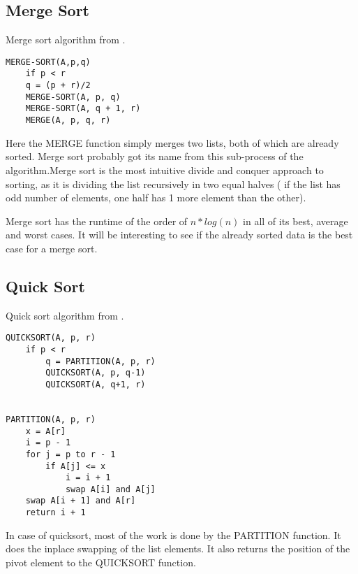 \documentclass[sigconf,  natbib, screen]{acmart}
\begin{document}
\subsection{Merge Sort}\label{sec:merge sort}

\begin{listing}
  \caption{Merge sort algorithm from \citet[Ch.~2.3.1]{CLRS_2009}.}
  \label{lst:merge_algo}

\begin{verbatim}
MERGE-SORT(A,p,q)
    if p < r
    q = (p + r)/2
    MERGE-SORT(A, p, q)
    MERGE-SORT(A, q + 1, r)
    MERGE(A, p, q, r)
\end{verbatim}
\end{listing}

Here the MERGE function simply merges two lists, both of which are already sorted. Merge sort probably got its name from this sub-process of the algorithm.Merge sort is the most intuitive divide and conquer approach to sorting, as it is dividing the list 
recursively in two equal halves ( if the list has odd number of elements, one half has 1 more element than the other).

Merge sort has the runtime of the order of $n*log(n)$ in all of its best, average and worst cases. It will be interesting to see 
if the already sorted data is the best case for a merge sort.

\subsection{Quick Sort}\label{sec:quick sort}

\begin{listing}
  \caption{Quick sort algorithm from \citet[Ch.~2.3.1]{CLRS_2009}.}
  \label{lst:quick_algo}

\begin{verbatim}
QUICKSORT(A, p, r)
    if p < r
        q = PARTITION(A, p, r)
        QUICKSORT(A, p, q-1)
        QUICKSORT(A, q+1, r)


PARTITION(A, p, r)
    x = A[r]
    i = p - 1
    for j = p to r - 1
        if A[j] <= x
            i = i + 1
            swap A[i] and A[j]
    swap A[i + 1] and A[r]
    return i + 1
\end{verbatim}
\end{listing}

In case of quicksort, most of the work is done by the PARTITION function. It does the inplace swapping of the list elements. It also 
returns the position of the pivot element to the QUICKSORT function.
\end{document}
